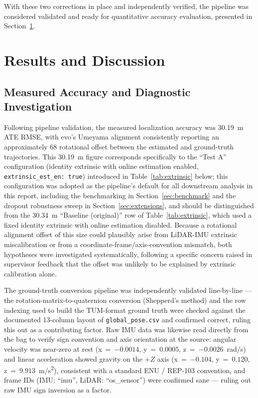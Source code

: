 \documentclass[conference]{IEEEtran}
\begin{document}
With these two corrections in place and independently verified, the pipeline was considered validated and ready for quantitative accuracy evaluation, presented in Section~\ref{sec:results}.

\section{Results and Discussion}
\label{sec:results}

\subsection{Measured Accuracy and Diagnostic Investigation}
\label{sec:diag}
Following pipeline validation, the measured localization accuracy was 30.19~m ATE RMSE, with evo's Umeyama alignment consistently reporting an approximately 68\textdegree{} rotational offset between the estimated and ground-truth trajectories. This 30.19~m figure corresponds specifically to the ``Test A'' configuration (identity extrinsic with online estimation enabled, \texttt{extrinsic\_est\_en: true}) introduced in Table~\ref{tab:extrinsic} below; this configuration was adopted as the pipeline's default for all downstream analysis in this report, including the benchmarking in Section~\ref{sec:benchmark} and the dropout robustness sweep in Section~\ref{sec:extensions}, and should be distinguished from the 30.34~m ``Baseline (original)'' row of Table~\ref{tab:extrinsic}, which used a fixed identity extrinsic with online estimation disabled. Because a rotational alignment offset of this size could plausibly arise from LiDAR-IMU extrinsic miscalibration or from a coordinate-frame/axis-convention mismatch, both hypotheses were investigated systematically, following a specific concern raised in supervisor feedback that the offset was unlikely to be explained by extrinsic calibration alone.

The ground-truth conversion pipeline was independently validated line-by-line --- the rotation-matrix-to-quaternion conversion (Shepperd's method) and the row indexing used to build the TUM-format ground truth were checked against the documented 13-column layout of \texttt{global\_pose.csv} and confirmed correct, ruling this out as a contributing factor. Raw IMU data was likewise read directly from the bag to verify sign convention and axis orientation at the source: angular velocity was near-zero at rest (x~=~$-0.0014$, y~=~$0.0005$, z~=~$-0.0026$~rad/s) and linear acceleration showed gravity on the $+Z$ axis (x~=~$-0.104$, y~=~$0.120$, z~=~$9.913$~m/s\textsuperscript{2}), consistent with a standard ENU / REP-103 convention, and frame IDs (IMU: ``imu'', LiDAR: ``os\_sensor'') were confirmed sane --- ruling out raw IMU sign inversion as a factor.
\end{document}
